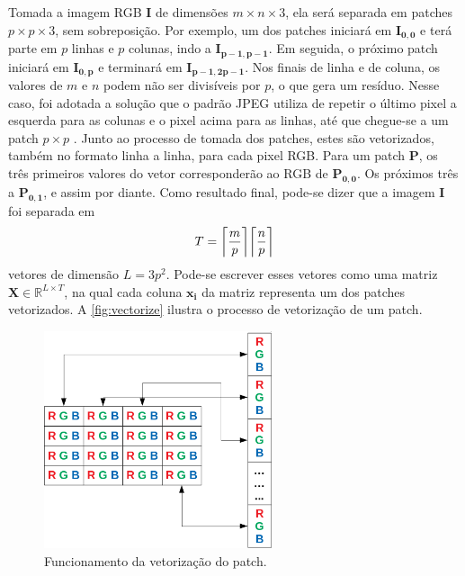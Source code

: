 \documentclass[cic,tc]{iiufrgs}
\renewcommand{\vec}[1]{\bm{#1}}
\newcommand{\mat}[1]{\bm{#1}}
\DeclarePairedDelimiter{\ceil}{\lceil}{\rceil}
\begin{document}
Tomada a imagem RGB $\mat{I}$ de dimensões $m \times n \times 3$, ela será separada em patches
$p \times p \times 3$, sem sobreposição. Por exemplo, um dos patches iniciará em $\mat{I_{0,0}}$
e terá parte em $p$ linhas e $p$ colunas, indo a $\mat{I_{p-1, p-1}}$. Em seguida, o próximo
patch iniciará em $\mat{I_{0, p}}$ e terminará em $\mat{I_{p-1, 2p-1}}$.
Nos finais de linha e de coluna, os valores de $m$ e $n$ podem não ser divisíveis por $p$,
o que gera um resíduo. 
Nesse caso, foi adotada a solução que o padrão JPEG utiliza de repetir
o último pixel a esquerda para as colunas e o pixel acima para as linhas, até que chegue-se
a um patch $p \times p$ \cite{mitchell1992digital}.
Junto ao processo de tomada dos patches, estes são vetorizados, também no formato 
linha a linha, para cada pixel RGB.
Para um patch $\mat{P}$, os três primeiros valores do vetor corresponderão ao RGB de
$\mat{P_{0,0}}$. 
Os próximos três a $\mat{P_{0,1}}$, e assim por diante.
Como resultado final, pode-se dizer que a imagem $\mat{I}$ foi separada em 
\begin{equation*}
    T = \ceil*{\frac{m}{p}} \ceil*{\frac{n}{p}}
\end{equation*}
vetores de dimensão $L = 3p^2$. Pode-se escrever esses vetores como uma matriz 
$\mat{X}\in \mathbb{R}^{L\times T}$, 
na qual cada coluna $\vec{x_i}$ da matriz representa um dos patches vetorizados. 
A \autoref{fig:vectorize} ilustra o processo de vetorização de um patch.
\begin{figure}[H]
    \caption{Funcionamento da vetorização do patch.}
    \begin{center}
        \includegraphics[width=0.6\textwidth]{img/vectorize}
    \end{center}
    \label{fig:vectorize}
\end{figure}
\end{document}
